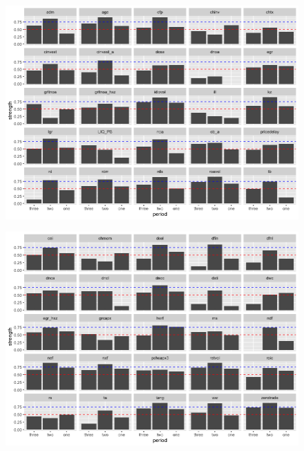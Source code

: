 \begin{landscape}
	\begin{figure}[ht]
		\includegraphics[scale = 0.75]{thirty_decompose_III}
		\centering
	\end{figure}
\end{landscape}

\begin{landscape}
	\begin{figure}[ht]
		\includegraphics[scale = 0.75]{thirty_decompose_IV}
		\centering
	\end{figure}
\end{landscape}

